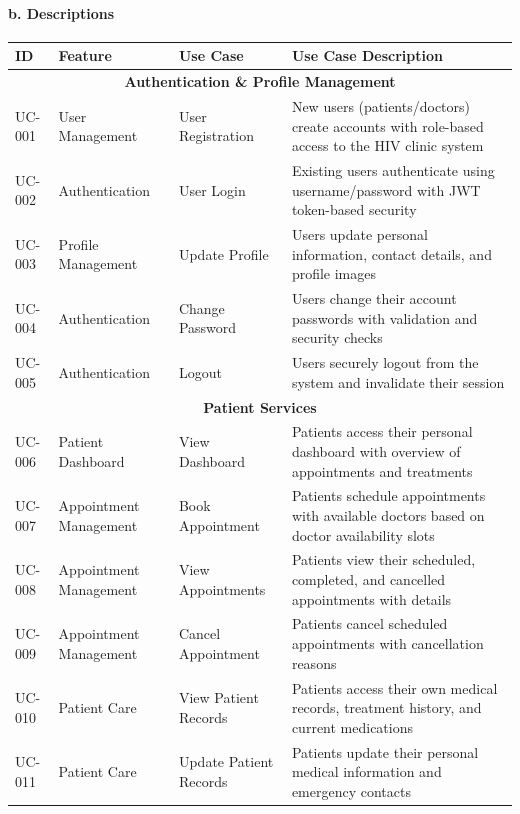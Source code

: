 \documentclass[12pt,a4paper]{article}
\begin{document}
\paragraph{b. Descriptions}

\begin{longtable}{|p{1cm}|p{3cm}|p{3cm}|p{7cm}|}
\hline
\textbf{ID} & \textbf{Feature} & \textbf{Use Case} & \textbf{Use Case Description} \\
\hline
\multicolumn{4}{|c|}{\textbf{Authentication \& Profile Management}} \\
\hline
UC-001 & User Management & User Registration & New users (patients/doctors) create accounts with role-based access to the HIV clinic system \\
\hline
UC-002 & Authentication & User Login & Existing users authenticate using username/password with JWT token-based security \\
\hline
UC-003 & Profile Management & Update Profile & Users update personal information, contact details, and profile images \\
\hline
UC-004 & Authentication & Change Password & Users change their account passwords with validation and security checks \\
\hline
UC-005 & Authentication & Logout & Users securely logout from the system and invalidate their session \\
\hline
\multicolumn{4}{|c|}{\textbf{Patient Services}} \\
\hline
UC-006 & Patient Dashboard & View Dashboard & Patients access their personal dashboard with overview of appointments and treatments \\
\hline
UC-007 & Appointment Management & Book Appointment & Patients schedule appointments with available doctors based on doctor availability slots \\
\hline
UC-008 & Appointment Management & View Appointments & Patients view their scheduled, completed, and cancelled appointments with details \\
\hline
UC-009 & Appointment Management & Cancel Appointment & Patients cancel scheduled appointments with cancellation reasons \\
\hline
UC-010 & Patient Care & View Patient Records & Patients access their own medical records, treatment history, and current medications \\
\hline
UC-011 & Patient Care & Update Patient Records & Patients update their personal medical information and emergency contacts \\

\end{longtable}
\end{document}
